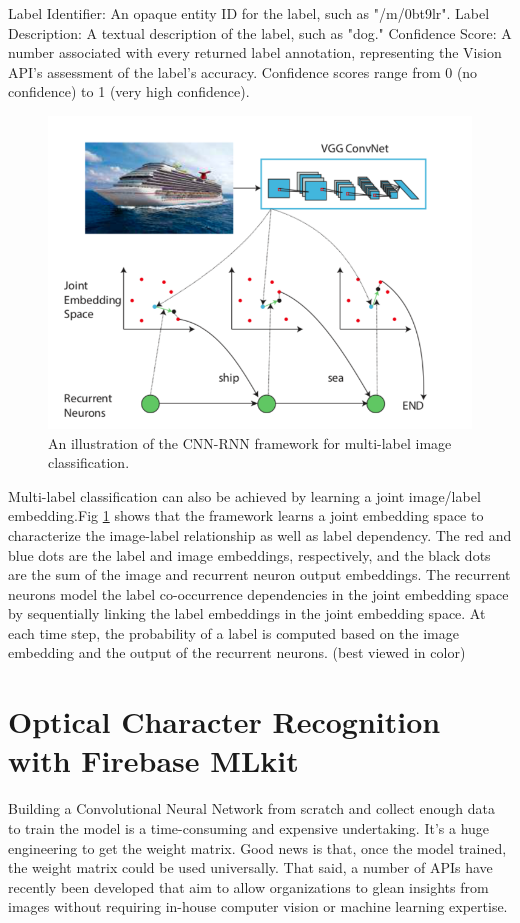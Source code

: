 \documentclass[11pt]{ucscthesis}
\begin{document}
Label Identifier: An opaque entity ID for the label, such as "/m/0bt9lr".
Label Description: A textual description of the label, such as "dog."
Confidence Score: A number associated with every returned label annotation, representing the Vision API's assessment of the label's accuracy. Confidence scores range from 0 (no confidence) to 1 (very high confidence).
\begin{figure}
    \centering
    \includegraphics[width =0.8\linewidth]{Fig/RNN- multiclassification.png}
    \caption{ An illustration of the CNN-RNN framework for multi-label image classification.\cite{wang2016cnn}}
    \label{multi-label image classification}
\end{figure}
Multi-label classification can also be achieved by learning a joint image/label embedding.Fig \ref{multi-label image classification} shows that the framework learns a joint embedding space to characterize the image-label relationship as well as label dependency. The red and blue dots are the label and image embeddings, respectively, and the black dots are the sum of the image and recurrent neuron output embeddings. The recurrent neurons model the label co-occurrence dependencies in the joint embedding space by sequentially linking the label embeddings in the joint embedding space. At each time step, the probability of a label is computed based on the image embedding and the output of the recurrent neurons. (best viewed in color)


\section{Optical Character Recognition with Firebase MLkit}
Building a Convolutional Neural Network from scratch and collect enough data \cite{GoogleDatasets} to train the model is a time-consuming and expensive undertaking. It's a huge engineering to get the weight matrix. Good news is that, once the model trained, the weight matrix could be used universally. That said, a number of APIs have recently been developed that aim to allow organizations to glean insights from images without requiring in-house computer vision or machine learning expertise.
\end{document}
